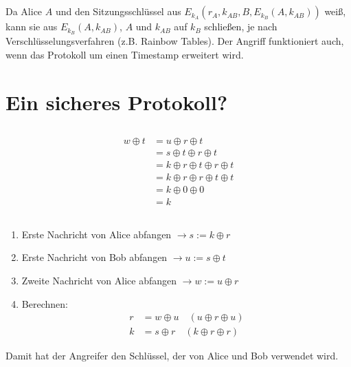 \documentclass{../crypto}
\begin{document}
\subsection{}

Da Alice $A$ und den Sitzungsschlüssel aus $E_{k_A}(r_A,k_{AB},B,E_{k_B}(A,k_{AB}))$
weiß, kann sie aus $E_{k_B}(A,k_{AB})$, $A$ und $k_{AB}$ auf $k_B$ schließen, je
nach Verschlüsselungsverfahren (z.B. Rainbow Tables). Der
Angriff funktioniert auch, wenn das Protokoll um einen Timestamp erweitert wird.

\section{Ein sicheres Protokoll?}
\subsection{}
\begin{align*}
	w \oplus t & = u \oplus r \oplus t                   \\
	           & = s \oplus t \oplus r \oplus t          \\
	           & = k \oplus r \oplus t \oplus r \oplus t \\
	           & = k \oplus r \oplus r \oplus t \oplus t \\
	           & = k \oplus 0 \oplus 0                   \\
	           & = k
\end{align*}

\subsection{}
\begin{enumerate}
    \item Erste Nachricht von Alice abfangen $\rightarrow s := k \oplus r$
    \item Erste Nachricht von Bob abfangen $\rightarrow u := s \oplus t$
    \item Zweite Nachricht von Alice abfangen $\rightarrow w := u \oplus r$
    \item Berechnen: 
        \begin{align*}
           r & = w \oplus u \quad \left(u \oplus r \oplus u\right)\\
           k & = s \oplus r \quad \left(k \oplus r \oplus r\right)
        \end{align*}
\end{enumerate}
Damit hat der Angreifer den Schlüssel, der von Alice und Bob verwendet wird.
\end{document}
